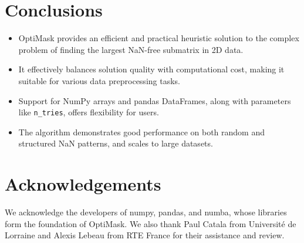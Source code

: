 \documentclass[a0,landscape]{a0poster}
\begin{document}
\begin{multicols}{4}
	\section*{Conclusions}

	\begin{itemize}
		\item OptiMask provides an efficient and practical heuristic solution to the complex problem of finding the largest NaN-free submatrix in 2D data.
		\item It effectively balances solution quality with computational cost, making it suitable for various data preprocessing tasks.
		\item Support for NumPy arrays and pandas DataFrames, along with parameters like \texttt{n\_tries}, offers flexibility for users.
		\item The algorithm demonstrates good performance on both random and structured NaN patterns, and scales to large datasets.
	\end{itemize}

	\color{DarkSlateGray} %




\section*{Acknowledgements}

We acknowledge the developers of numpy, pandas, and numba, whose libraries form the foundation of
OptiMask. We also thank Paul Catala from Université de Lorraine and Alexis Lebeau from RTE France
for their assistance and review.



\end{multicols}
\end{document}
